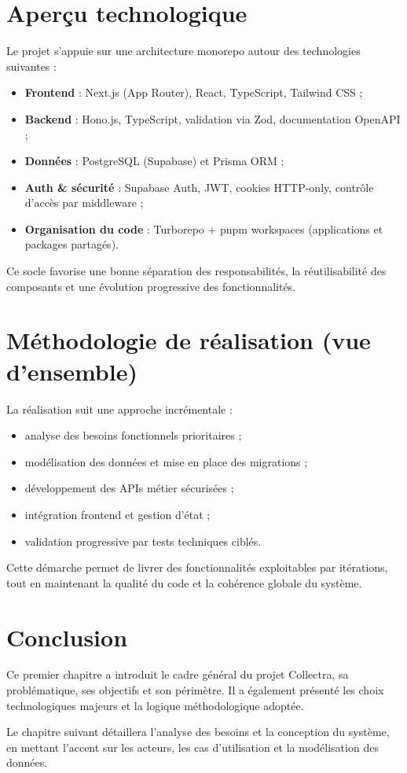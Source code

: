 \section{Aperçu technologique}
Le projet s'appuie sur une architecture monorepo autour des technologies suivantes :
\begin{itemize}
  \item \textbf{Frontend} : Next.js (App Router), React, TypeScript, Tailwind CSS ;
  \item \textbf{Backend} : Hono.js, TypeScript, validation via Zod, documentation OpenAPI ;
  \item \textbf{Données} : PostgreSQL (Supabase) et Prisma ORM ;
  \item \textbf{Auth \& sécurité} : Supabase Auth, JWT, cookies HTTP-only, contrôle d'accès par middleware ;
  \item \textbf{Organisation du code} : Turborepo + pnpm workspaces (applications et packages partagés).
\end{itemize}

Ce socle favorise une bonne séparation des responsabilités, la réutilisabilité des composants et une évolution progressive des fonctionnalités.

\section{Méthodologie de réalisation (vue d'ensemble)}
La réalisation suit une approche incrémentale :
\begin{itemize}
  \item analyse des besoins fonctionnels prioritaires ;
  \item modélisation des données et mise en place des migrations ;
  \item développement des APIs métier sécurisées ;
  \item intégration frontend et gestion d'état ;
  \item validation progressive par tests techniques ciblés.
\end{itemize}

Cette démarche permet de livrer des fonctionnalités exploitables par itérations, tout en maintenant la qualité du code et la cohérence globale du système.

\section*{Conclusion}
Ce premier chapitre a introduit le cadre général du projet Collectra, sa problématique, ses objectifs et son périmètre. Il a également présenté les choix technologiques majeurs et la logique méthodologique adoptée.

Le chapitre suivant détaillera l'analyse des besoins et la conception du système, en mettant l'accent sur les acteurs, les cas d'utilisation et la modélisation des données.
